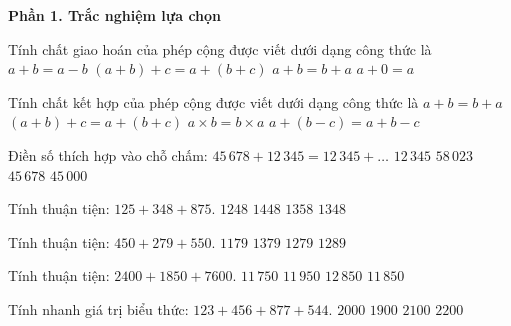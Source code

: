 \textbf{Phần 1. Trắc nghiệm lựa chọn}

\begin{ex} %
Tính chất giao hoán của phép cộng được viết dưới dạng công thức là
\choice
{$a + b = a - b$}
{$(a + b) + c = a + (b + c)$}
{\True $a + b = b + a$}
{$a + 0 = a$}
\end{ex}

\begin{ex} %
Tính chất kết hợp của phép cộng được viết dưới dạng công thức là
\choice
{$a + b = b + a$}
{\True $(a + b) + c = a + (b + c)$}
{$a \times b = b \times a$}
{$a + (b - c) = a + b - c$}
\end{ex}

\begin{ex} %
Điền số thích hợp vào chỗ chấm: $45\,678 + 12\,345 = 12\,345 + \dots$
\choice
{$12\,345$}
{$58\,023$}
{\True $45\,678$}
{$45\,000$}
\end{ex}

\begin{ex} %
Tính thuận tiện: $125 + 348 + 875$.
\choice
{$1248$}
{$1448$}
{$1358$}
{\True $1348$}
\end{ex}

\begin{ex} %
Tính thuận tiện: $450 + 279 + 550$.
\choice
{$1179$}
{$1379$}
{\True $1279$}
{$1289$}
\end{ex}

\begin{ex} %
Tính thuận tiện: $2400 + 1850 + 7600$.
\choice
{$11\,750$}
{$11\,950$}
{$12\,850$}
{\True $11\,850$}
\end{ex}

\begin{ex} %
Tính nhanh giá trị biểu thức: $123 + 456 + 877 + 544$.
\choice
{\True $2000$}
{$1900$}
{$2100$}
{$2200$}
\end{ex}

